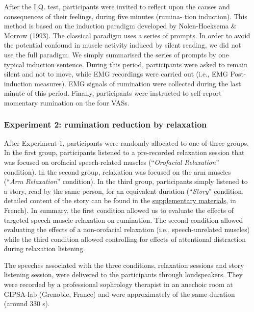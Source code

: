 \documentclass[a4paper,12pt,twoside,openright,oldfontcommands]{memoir}
\begin{document}
After the I.Q. test, participants were invited to reflect upon the causes and consequences of their feelings, during five minutes (rumina- tion induction). This method is based on the induction paradigm developed by Nolen-Hoeksema \& Morrow (\protect\hyperlink{ref-nolen-hoeksema_effects_1993}{1993}). The classical paradigm uses a series of prompts. In order to avoid the potential confound in muscle activity induced by silent reading, we did not use the full paradigm. We simply summarised the series of prompts by one typical induction sentence. During this period, participants were asked to remain silent and not to move, while EMG recordings were carried out (i.e., EMG Post-induction measures). EMG signals of rumination were collected during the last minute of this period. Finally, participants were instructed to self-report momentary rumination on the four VASs.

\hypertarget{experiment-2-rumination-reduction-by-relaxation}{%
\subsubsection{Experiment 2: rumination reduction by relaxation}\label{experiment-2-rumination-reduction-by-relaxation}}

After Experiment 1, participants were randomly allocated to one of three groups. In the first group, participants listened to a pre-recorded relaxation session that was focused on orofacial speech-related muscles (\enquote{\emph{Orofacial Relaxation}} condition). In the second group, relaxation was focused on the arm muscles (\enquote{\emph{Arm Relaxation}} condition). In the third group, participants simply listened to a story, read by the same person, for an equivalent duration (\enquote{\emph{Story}} condition, detailed content of the story can be found in the \protect\hyperlink{suppCH3}{supplementary materials}, in French). In summary, the first condition allowed us to evaluate the effects of targeted speech muscle relaxation on rumination. The second condition allowed evaluating the effects of a non-orofacial relaxation (i.e., speech-unrelated muscles) while the third condition allowed controlling for effects of attentional distraction during relaxation listening.

The speeches associated with the three conditions, relaxation sessions and story listening session, were delivered to the participants through loudspeakers. They were recorded by a professional sophrology therapist in an anechoic room at GIPSA-lab (Grenoble, France) and were approximately of the same duration (around 330 s).
\end{document}
